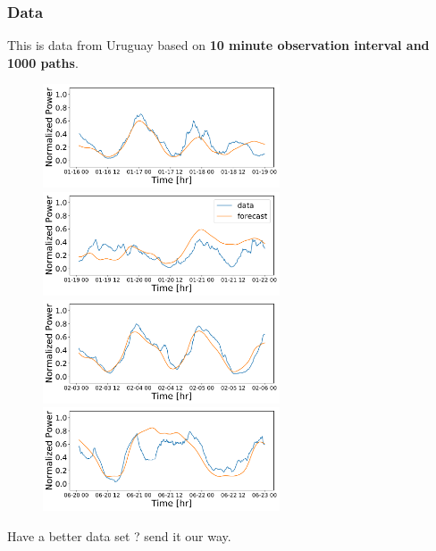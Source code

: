 \documentclass[aspectratio=169]{beamer}\usepackage[utf8]{inputenc}
\begin{document}
\begin{frame}\frametitle{Data}
This is data from Uruguay based on \textbf{10 minute observation interval and 1000 paths}.
\begin{figure}
  \includegraphics[width=70mm,scale=1]{plots/data_1516064400.pdf}
  \includegraphics[width=70mm,scale=1]{plots/data_1516323600.pdf}\\
  \includegraphics[width=70mm,scale=1]{plots/data_1517619600.pdf}
  \includegraphics[width=70mm,scale=1]{plots/data_1529456400.pdf}
\end{figure}
Have a better data set ? send it our way.
\end{frame}
\end{document}
